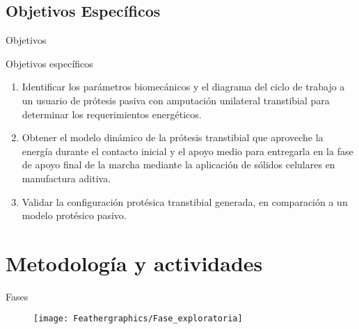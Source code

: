 \documentclass[10pt]{beamer}
\begin{document}
\subsection{Objetivos Específicos}
\begin{frame}{Objetivos}

\begin{exampleblock}{Objetivos específicos}

\begin{enumerate}
\item Identificar los parámetros biomecánicos y el diagrama del ciclo de
trabajo a un usuario de prótesis pasiva con amputación unilateral
transtibial para determinar los requerimientos energéticos.
\item Obtener el modelo dinámico de la prótesis transtibial que aproveche
la energía durante el contacto inicial y el apoyo medio para entregarla
en la fase de apoyo final de la marcha mediante la aplicación de sólidos
celulares en manufactura aditiva.
\item Validar la configuración protésica transtibial generada, en comparación
a un modelo protésico pasivo.
\end{enumerate}
\end{exampleblock}
\end{frame}


\section{Metodología y actividades}
\begin{frame}{Fases}

\begin{figure}
\centering{}\texttt{[image: Feathergraphics/Fase\_exploratoria]}
\end{figure}

\end{frame}
\end{document}
